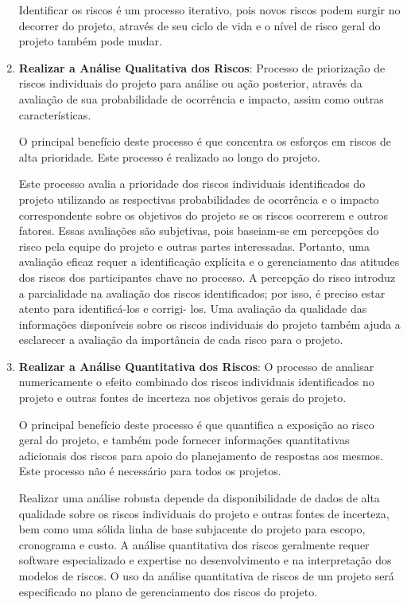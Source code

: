 \documentclass[
	12pt,
	openright,
	twoside,
	a4paper,
	english,
	brazil
	]{abntex2}
\begin{document}
\begin{enumerate}
  Identificar os riscos é um processo iterativo, pois novos riscos podem surgir no decorrer do projeto, através de seu ciclo de vida e o nível de risco geral do projeto também pode mudar.

  \item \textbf{Realizar a Análise Qualitativa dos Riscos}: Processo de priorização de riscos individuais do projeto para análise ou ação posterior, através da avaliação de sua probabilidade de ocorrência e impacto, assim como outras características.  
  
  O principal benefício deste processo é que concentra os esforços em riscos de alta prioridade. Este processo é realizado ao longo do projeto.  
  
  Este processo avalia a prioridade dos riscos individuais identificados do projeto utilizando as respectivas probabilidades de ocorrência e o impacto correspondente sobre os objetivos do projeto se os riscos ocorrerem e outros fatores. Essas avaliações são subjetivas, pois baseiam-se em percepções do risco pela equipe do projeto e outras partes interessadas. Portanto, uma avaliação eficaz requer a identificação explícita e o gerenciamento das atitudes dos riscos dos participantes chave no processo. A percepção do risco introduz a parcialidade na avaliação dos riscos identificados; por isso, é preciso estar atento para identificá-los e corrigi- los. Uma avaliação da qualidade das informações disponíveis sobre os riscos individuais do projeto também ajuda a esclarecer a avaliação da importância de cada risco para o projeto.

  \item \textbf{Realizar a Análise Quantitativa dos Riscos}: O processo de analisar numericamente o efeito combinado dos riscos individuais identificados no projeto e outras fontes de incerteza nos objetivos gerais do projeto.  
  
  O principal benefício deste processo é que quantifica a exposição ao risco geral do projeto, e também pode fornecer informações quantitativas adicionais dos riscos para apoio do planejamento de respostas aos mesmos. Este processo não é necessário para todos os projetos.  
  
  Realizar uma análise robusta depende da disponibilidade de dados de alta qualidade sobre os riscos individuais do projeto e outras fontes de incerteza, bem como uma sólida linha de base subjacente do projeto para escopo, cronograma e custo. A análise quantitativa dos riscos geralmente requer software especializado e expertise no desenvolvimento e na interpretação dos modelos de riscos. O uso da análise quantitativa de riscos de um projeto será especificado no plano de gerenciamento dos riscos do projeto.


\end{enumerate}
\end{document}
